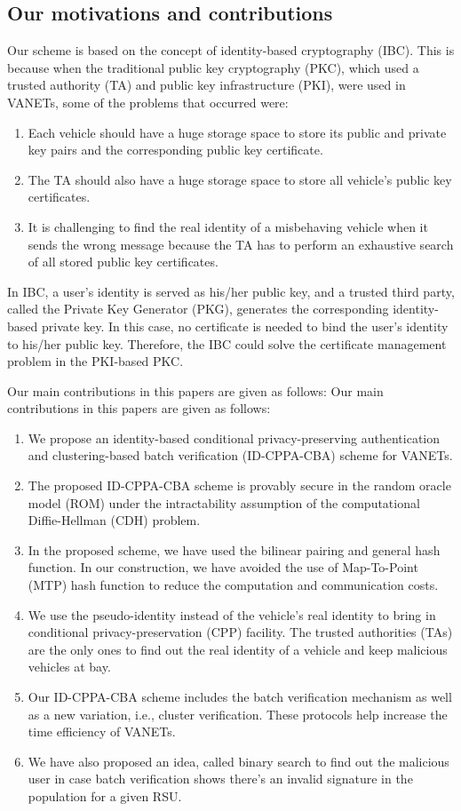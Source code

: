 \documentclass[10pt,journal,letterpaper]{IEEEtran}
\begin{document}
\subsection{Our motivations and contributions}
Our scheme is based on the concept of identity-based cryptography
(IBC). This is because when the traditional public key cryptography
(PKC), which used a trusted authority (TA) and public key
infrastructure (PKI), were used in VANETs, some of the problems that
occurred were:
\begin{enumerate}[label=\textbf{(\arabic*).}]
\item Each vehicle should have a huge storage space to store its public and private key pairs and the corresponding public key certificate.
\item The TA should also have a huge storage space to store all vehicle's public key certificates.
\item It is challenging to find the real identity of a misbehaving vehicle when it sends the wrong message because the TA has to perform an exhaustive search of all stored public key certificates.
\end{enumerate}
In IBC, a user's identity is served as his/her public key, and a
trusted third party, called the Private Key Generator (PKG),
generates the corresponding identity-based private key. In this
case, no certificate is needed to bind the user's identity to
his/her public key. Therefore, the IBC could solve the certificate
management problem in the PKI-based PKC.


Our main contributions in this papers are given as follows: Our main
contributions in this papers are given as follows:
\begin{enumerate}[label=\textbf{(\arabic*).}]
\item We propose an identity-based conditional privacy-preserving authentication and clustering-based batch verification (ID-CPPA-CBA) scheme for VANETs.
\item The proposed ID-CPPA-CBA scheme is provably secure in the random oracle model (ROM) under the intractability assumption of the computational Diffie-Hellman (CDH) problem.
\item In the proposed scheme, we have used the bilinear pairing and general hash function. In our construction, we have avoided the use of Map-To-Point  (MTP) hash function to reduce the computation and communication costs.
\item We use the pseudo-identity instead of the vehicle's real identity to bring in conditional privacy-preservation (CPP) facility. The trusted authorities (TAs) are the only ones to find out the real identity of a vehicle and keep malicious vehicles at bay.
\item Our ID-CPPA-CBA scheme includes the batch verification mechanism as well as a new variation, i.e., cluster verification. These protocols help increase the time efficiency of VANETs.
\item We have also proposed an idea, called binary search to find out the malicious user in case batch verification shows there's an invalid signature in the population for a given RSU.
\end{enumerate}
\end{document}

